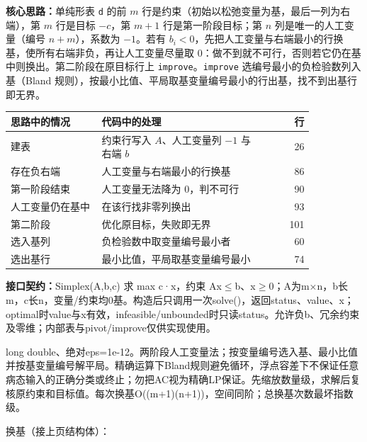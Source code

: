 \textbf{核心思路：}\allowbreak 单纯形表 \texttt{d} 的前 $m$ 行是约束（初始以松弛变量为基，最后一列为右端），第 $m$ 行是目标 $-c$，第 $m+1$ 行是第一阶段目标；第 $n$ 列是唯一的人工变量（编号 $n+m$），系数为 $-1$。若有 $b_i<0$，先把人工变量与右端最小的行换基，使所有右端非负，再让人工变量尽量取 0：做不到就不可行，否则若它仍在基中则换出。第二阶段在原目标行上 \texttt{improve}。\texttt{improve} 选编号最小的负检验数列入基（Bland 规则），按最小比值、平局取基变量编号最小的行出基，找不到出基行即无界。

\begin{center}\small
\begin{tabular}{@{}p{0.30\linewidth}p{0.55\linewidth}r@{}}
\toprule
思路中的情况 & 代码中的处理 & 行\\
\midrule
建表 & 约束行写入 $A$、人工变量列 $-1$ 与右端 $b$ & 26\\
存在负右端 & 人工变量与右端最小的行换基 & 86\\
第一阶段结束 & 人工变量无法降为 0，判不可行 & 90\\
人工变量仍在基中 & 在该行找非零列换出 & 93\\
第二阶段 & 优化原目标，失败即无界 & 101\\
选入基列 & 负检验数中取变量编号最小者 & 60\\
选出基行 & 最小比值，平局取基变量编号最小 & 74\\
\bottomrule
\end{tabular}
\end{center}



{\sloppy{}\noindent\textbf{接口契约：}Simplex(A,b,c) 求 max c·x，约束 Ax$\le$b、x$\ge$0；A为m×n，b长m，c长n，变量/约束均0基。构造后只调用一次solve()，返回status、value、x；optimal时value与x有效，infeasible/unbounded时只读status。允许负b、冗余约束及零维；内部表与pivot/improve仅供实现使用。

long double、绝对eps=1e-12。两阶段人工变量法；按变量编号选入基、最小比值并按基变量编号解平局。精确运算下Bland规则避免循环，浮点容差下不保证任意病态输入的正确分类或终止；勿把AC视为精确LP保证。先缩放数量级，求解后复核原约束和目标值。每次换基O((m+1)(n+1))，空间同阶；总换基次数最坏指数级。\par}

\Needspace{466pt}



\newpage

换基（接上页结构体）：

